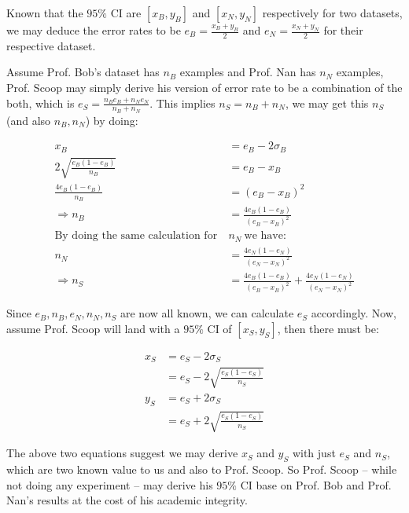 \documentclass[12pt]{article}
\begin{document}

% 
% 

Known that the $95 \%$ CI are $[x_B, y_B]$ and $[x_N, y_N]$ respectively for two datasets, we may deduce the error rates to be $e_B = \frac{x_B + y_B}{2}$ and $e_N = \frac{x_N + y_N}{2}$ for their respective dataset.

Assume Prof. Bob's dataset has $n_B$ examples and Prof. Nan has $n_N$ examples, Prof. Scoop may simply derive his version of error rate to be a combination of the both, which is $e_S = \frac{n_B e_B + n_N e_N}{n_B + n_N}$. This implies $n_S = n_B + n_N$, we may get this $n_S$ (and also $n_B, n_N$) by doing:

\begin{align*}
    x_B &= e_B - 2\sigma_B \\
    2\sqrt{\frac{e_B(1-e_B)}{n_B}} &= e_B - x_B \\
    \frac{4 e_B(1-e_B)}{n_B} &= (e_B - x_B)^2 \\
    \Longrightarrow n_B &= \frac{4 e_B(1-e_B)}{(e_B - x_B)^2} \\
    \text{By doing the same calculation for} \ &n_N \ \text{we have:} \\
    n_N &= \frac{4 e_N(1-e_N)}{(e_N - x_N)^2} \\
    \Longrightarrow n_S &= \frac{4 e_B(1-e_B)}{(e_B - x_B)^2} + \frac{4 e_N(1-e_N)}{(e_N - x_N)^2}
\end{align*}

Since $e_B, n_B, e_N, n_N, n_S$ are now all known, we can calculate $e_S$ accordingly. Now, assume Prof. Scoop will land with a $95 \%$ CI of $[x_S, y_S]$, then there must be:

\begin{align*}
    x_S &= e_S - 2 \sigma_S \\
    &= e_S - 2\sqrt{\frac{e_S(1-e_S)}{n_S}} \\
    y_S &= e_S + 2 \sigma_S \\
    &= e_S + 2\sqrt{\frac{e_S(1-e_S)}{n_S}}
\end{align*}

The above two equations suggest we may derive $x_S$ and $y_S$ with just $e_S$ and $n_S$, which are two known value to us and also to Prof. Scoop. So Prof. Scoop -- while not doing any experiment -- may derive his $95\%$ CI base on Prof. Bob and Prof. Nan's results at the cost of his academic integrity.
\end{document}
